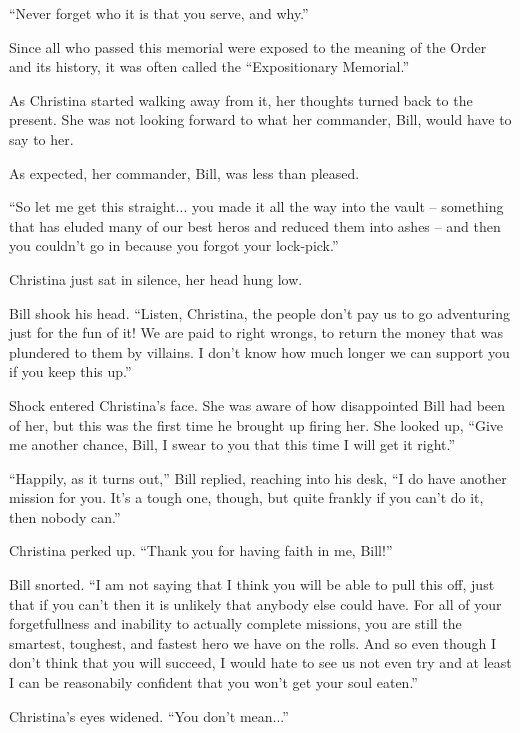 \documentclass[showtrims,b6paper,draft,10pt]{memoir}
\begin{document}
``Never forget who it is that you serve, and why.''

Since all who passed this memorial were exposed to the meaning of the Order and its history, it was often called the ``Expositionary Memorial.''

As Christina started walking away from it, her thoughts turned back to the present.  She was not looking forward to what her commander, Bill, would have to say to her.

\timeskip

As expected, her commander, Bill, was less than pleased.

``So let me get this straight... you made it all the way into the vault -- something that has eluded many of our best heros and reduced them into ashes -- and then you couldn't go in because you forgot your lock-pick.''

Christina just sat in silence, her head hung low.

Bill shook his head.  ``Listen, Christina, the people don't pay us to go adventuring just for the fun of it!  We are paid to right wrongs, to return the money that was plundered to them by villains.  I don't know how much longer we can support you if you keep this up.''

Shock entered Christina's face.  She was aware of how disappointed Bill had been of her, but this was the first time he brought up firing her.  She looked up,  ``Give me another chance, Bill, I swear to you that this time I will get it right.''

``Happily, as it turns out,'' Bill replied, reaching into his desk, ``I do have another mission for you.  It's a tough one, though, but quite frankly if you can't do it, then nobody can.''

Christina perked up.  ``Thank you for having faith in me, Bill!''

Bill snorted.  ``I am not saying that I think you will be able to pull this off, just that if you can't then it is unlikely that anybody else could have.  For all of your forgetfullness and inability to actually complete missions, you are still the smartest, toughest, and fastest hero we have on the rolls.  And so even though I don't think that you will succeed, I would hate to see us not even try and at least I can be reasonabily confident that you won't get your soul eaten.''

Christina's eyes widened.  ``You don't mean...''
\end{document}
